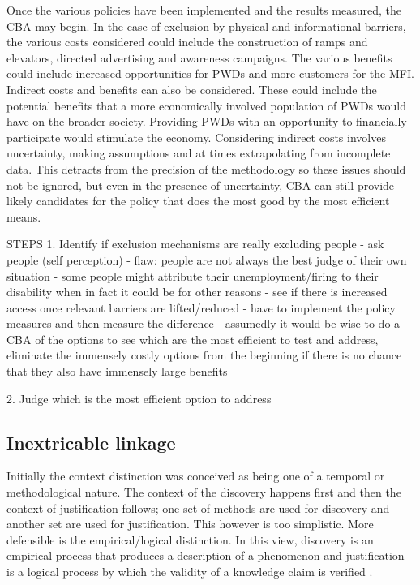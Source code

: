 \documentclass[a4paper]{article}
\begin{document}
Once the various policies have been implemented and the results measured, the
CBA may begin. In the case of exclusion by physical and informational
barriers, the various costs considered could include the construction of ramps
and elevators, directed advertising and awareness campaigns. The various
benefits could include increased opportunities for PWDs and more customers for
the MFI. Indirect costs and benefits can also be considered. These could
include the potential benefits that a more economically involved population of
PWDs would have on the broader society. Providing PWDs with an opportunity to
financially participate would stimulate the economy. Considering indirect
costs involves uncertainty, making assumptions and at times extrapolating from
incomplete data. This detracts from the precision of the methodology so these
issues should not be ignored, but even in the presence of uncertainty, CBA can
still provide likely candidates for the policy that does the most good by the
most efficient means.





STEPS
1. Identify if exclusion mechanisms are really excluding people
    - ask people (self perception)
        - flaw: people are not always the best judge of their own situation
            - some people might attribute their unemployment/firing to their
            disability when in fact it could be for other reasons
    - see if there is increased access once relevant barriers are
      lifted/reduced
        - have to implement the policy measures and then measure the
          difference
        - assumedly it would be wise to do a CBA of the options to see which
        are the most efficient to test and address, eliminate the immensely
        costly options from the beginning if there is no chance that they also
        have immensely large benefits

2. Judge which is the most efficient option to address



\subsection{Inextricable linkage}

Initially the context distinction was conceived as being one of a temporal or
methodological nature. The context of the discovery happens first and then the
context of justification follows; one set of methods are used for discovery
and another set are used for justification. This however is too simplistic.
More defensible is the empirical/logical distinction. In this view, discovery
is an empirical process that produces a description of a phenomenon and
justification is a logical process by which the validity of a knowledge claim
is verified \cite{hoyningen2006context}.
\end{document}
